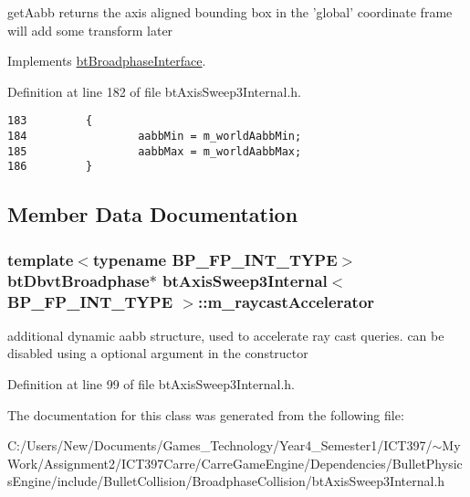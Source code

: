 getAabb returns the axis aligned bounding box in the 'global' coordinate frame will add some transform later 

Implements \hyperlink{classbt_broadphase_interface_b5af9e26414f5a72a76040b8fab4d9e2}{btBroadphaseInterface}.

Definition at line 182 of file btAxisSweep3Internal.h.

\begin{Code}\begin{verbatim}183         {
184                 aabbMin = m_worldAabbMin;
185                 aabbMax = m_worldAabbMax;
186         }
\end{verbatim}
\end{Code}




\subsection{Member Data Documentation}
\hypertarget{classbt_axis_sweep3_internal_a0c964a27cd6722bdd231890b1239528}{
\subsubsection[m\_\-raycastAccelerator]{\setlength{\rightskip}{0pt plus 5cm}template$<$typename BP\_\-FP\_\-INT\_\-TYPE$>$ {\bf btDbvtBroadphase}$\ast$ {\bf btAxisSweep3Internal}$<$ BP\_\-FP\_\-INT\_\-TYPE $>$::{\bf m\_\-raycastAccelerator}}}
\label{classbt_axis_sweep3_internal_a0c964a27cd6722bdd231890b1239528}


additional dynamic aabb structure, used to accelerate ray cast queries. can be disabled using a optional argument in the constructor 

Definition at line 99 of file btAxisSweep3Internal.h.

The documentation for this class was generated from the following file:\begin{CompactItemize}
\item 
C:/Users/New/Documents/Games\_\-Technology/Year4\_\-Semester1/ICT397/$\sim$My Work/Assignment2/ICT397Carre/CarreGameEngine/Dependencies/BulletPhysicsEngine/include/BulletCollision/BroadphaseCollision/btAxisSweep3Internal.h\end{CompactItemize}
